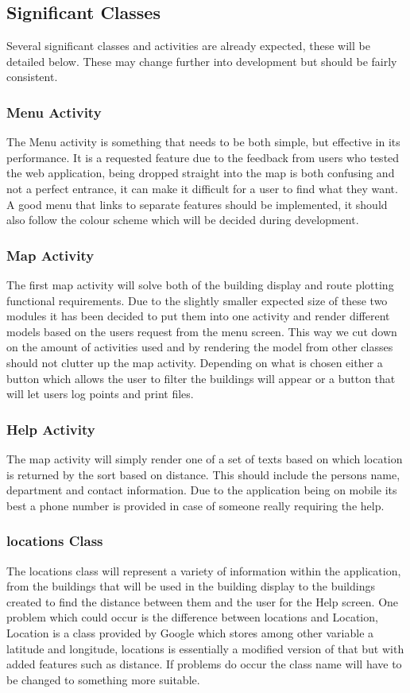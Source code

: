 \subsection{Significant Classes}
Several significant classes and activities are already expected, these will be detailed below. These may change further into development but should be fairly consistent.
\subsubsection{Menu Activity}
The Menu activity is something that needs to be both simple, but effective in its performance. It is a requested feature due to the feedback from users who tested the web application, being dropped straight into the map is both confusing and not a perfect entrance, it can make it difficult for a user to find what they want. A good menu that links to separate features should be implemented, it should also follow the colour scheme which will be decided during development.
\subsubsection{Map Activity}
The first map activity will solve both of the building display and route plotting functional requirements. Due to the slightly smaller expected size of these two modules it has been decided to put them into one activity and render different models based on the users request from the menu screen. This way we cut down on the amount of activities used and by rendering the model from other classes should not clutter up the map activity. Depending on what is chosen either a button which allows the user to filter the buildings will appear or a button that will let users log points and print files. 
\subsubsection{Help Activity}
The map activity will simply render one of a set of texts based on which location is returned by the sort based on distance. This should include the persons name, department and contact information. Due to the application being on mobile its best a phone number is provided in case of someone really requiring the help. 
\subsubsection{locations Class}
The locations class will represent a variety of information within the application, from the buildings that will be used in the building display to the buildings created to find the distance between them and the user for the Help screen. One problem which could occur is the difference between locations and Location, Location is a class provided by Google which stores among other variable a latitude and longitude, locations is essentially a modified version of that but with added features such as distance. If problems do occur the class name will have to be changed to something more suitable. 
